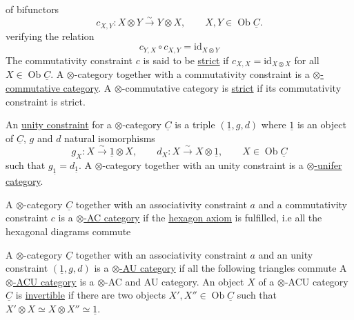 of bifunctors
\[
c_{X,Y}:X\otimes Y\xrightarrow{\sim}Y\otimes X,\qquad X,Y\in\operatorname{Ob}\underline{C}.
\]
verifying the relation
\[
c_{Y,X}\circ c_{X,Y}=\mathrm{id}_{X\otimes Y}
\]
The commutativity constraint $c$ is said to be \uline{strict} if $c_{X,X}=\mathrm{id}_{X\otimes X}$ for all $X\in\operatorname{Ob}\underline{C}$. A $\otimes$-category together with a commutativity constraint is a \uline{$\otimes$-commutative category}. A $\otimes$-commutative category is \uline{strict} if its commutativity constraint is strict.

An \uline{unity constraint} for a $\otimes$-category $\underline{C}$ is a triple $(\underline{1},g,d)$ where $\underline{1}$ is an object of $\underline{C}$, $g$ and $d$ natural isomorphisms
\[
g_X:X\xrightarrow{\sim}\underline{1}\otimes X,\qquad
d_X:X\xrightarrow{\sim}X\otimes\underline{1},\qquad X\in\operatorname{Ob}\underline{C}
\]
such that $g_{\underline{1}}=d_{\underline{1}}$. A $\otimes$-category together with an unity constraint is a \uline{$\otimes$-unifer category}.

A $\otimes$-category $\underline{C}$ together with an associativity constraint $a$ and a commutativity constraint $c$ is a \uline{$\otimes$-AC category} if the \uline{hexagon axiom} is fulfilled, i.e all the hexagonal diagrams commute

A $\otimes$-category $\underline{C}$ together with an associativity constraint $a$ and an unity constraint $(\underline{1},g,d)$ is a \uline{$\otimes$-AU category} if all the following triangles commute
A \uline{$\otimes$-ACU category} is a $\otimes$-AC and AU category. An object $X$ of a $\otimes$-ACU category $\underline{C}$ is \uline{invertible} if there are two objects $X',X''\in\operatorname{Ob}\underline{C}$ such that $X'\otimes X\simeq X\otimes X''\simeq\underline{1}$.

